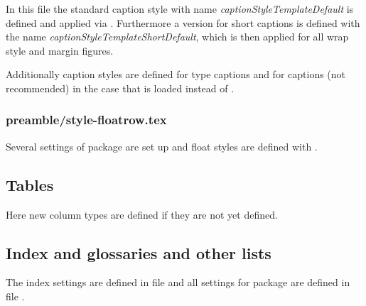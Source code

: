 In this file the standard caption style with name \emph{captionStyleTemplateDefault} is defined and applied via . Furthermore a version for short captions is defined with the name \emph{captionStyleTemplateShortDefault}, which is then applied for all wrap style and margin figures.

Additionally caption styles are defined for  type captions and for  captions (not recommended) in the case that  is loaded instead of .


\subsubsection{preamble/style-floatrow.tex}

Several settings of package  are set up and float styles are defined with .



\subsection{Tables}
\label{sec:style:tables}

Here new column types are defined if they are not yet defined.


\subsection{Index and glossaries and other lists}
\label{sec:style:index}

The index settings are defined in file  and all settings for package  are defined in file .


